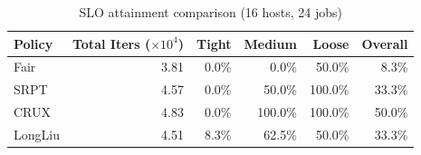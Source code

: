 \begin{table}[t]
\centering
\caption{SLO attainment comparison (16 hosts, 24 jobs)}
\label{tab:slo_16host}
\begin{tabular}{l|r|r|r|r|r}
\hline
Policy & Total Iters ($\times 10^4$) & Tight & Medium & Loose & Overall \\
\hline
Fair & 3.81 & 0.0\% & 0.0\% & 50.0\% & 8.3\% \\
SRPT & 4.57 & 0.0\% & 50.0\% & 100.0\% & 33.3\% \\
CRUX & 4.83 & 0.0\% & 100.0\% & 100.0\% & 50.0\% \\
LongLiu & 4.51 & 8.3\% & 62.5\% & 50.0\% & 33.3\% \\
\hline
\end{tabular}
\end{table}
